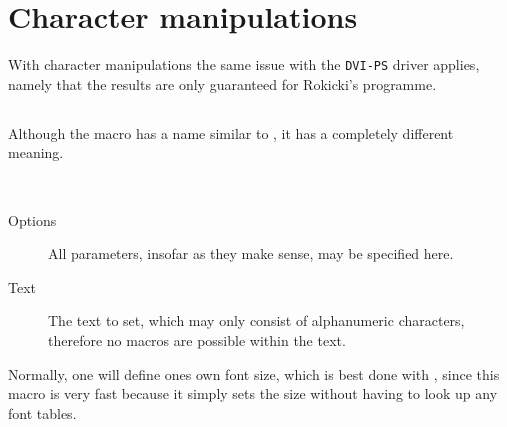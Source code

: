 \documentclass[11pt,english,BCOR10mm,DIV12,bibliography=totoc,parskip=false,smallheadings
    headexclude,footexclude,oneside]{pst-doc}
\begin{document}
\section{Character manipulations}\label{sec:psttext:Zeichenmanipulationen}
With character manipulations the same issue with the \verb+DVI-PS+ driver applies, 
namely that the results are only guaranteed for Rokicki's 
 programme.

\subsection{}\label{sec:psttext:pscharpath}
Although the macro  has a name similar to , it has a 
completely different meaning.
%
\begin{BDef}
\OptArgs{}\\
\OptArgs{}
\end{BDef}

\begin{description}
\item[Options] All \PST parameters, insofar as they make sense, may be
	specified here.
\item[Text] The text to set, which may only consist of alphanumeric
	characters, therefore no macros are possible within the text.
\end{description}

Normally, one will define ones own font size, which is best  done with 
, since this macro is very
fast because it simply sets the size without having to look up any font tables.

\medskip\noindent
\begin{LTXexample}[width=6.5cm,pos=l]
\\
\\
\\
\end{LTXexample}
\end{document}
